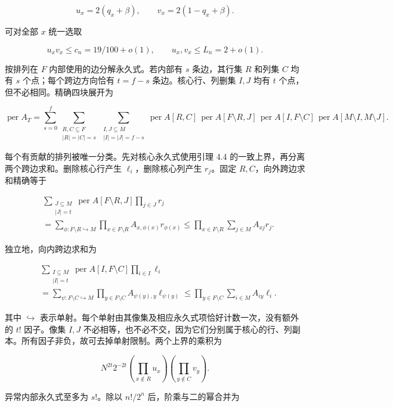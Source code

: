 \documentclass[11pt,a4paper]{article}
\begin{document}
\[u_x=2(q_x+\beta),\qquad v_x=2(1-q_x+\beta).\]

可对全部 \(x\) 统一选取

\[u_xv_x\le c_n=19/100+o(1),\qquad
u_x,v_x\le L_n=2+o(1).\]

按排列在 \(F\) 内部使用的边分解永久式。若内部有 \(s\) 条边，其行集 \(R\) 和列集 \(C\) 均有 \(s\) 个点；每个跨边方向恰有 \(t=f-s\) 条边。核心行、列删集 \(I,J\) 均有 \(t\) 个点，但不必相同。精确四块展开为

\[\operatorname{per}A_T
=\sum_{s=0}^{f}
\sum_{\substack{R,C\subseteq F\\|R|=|C|=s}}
\sum_{\substack{I,J\subseteq M\\|I|=|J|=f-s}}
\operatorname{per}A[R,C]\,
\operatorname{per}A[F\setminus R,J]\,
\operatorname{per}A[I,F\setminus C]\,
\operatorname{per}A[M\setminus I,M\setminus J].\]

每个有贡献的排列被唯一分类。先对核心永久式使用引理 4.4 的一致上界，再分离两个跨边求和。删除核心行产生 \(\ell_i\)，删除核心列产生 \(r_j\)。固定 \(R,C\)，向外跨边求和精确等于

\[\begin{aligned}
&\sum_{\substack{J\subseteq M\\|J|=t}}
\operatorname{per}A[F\setminus R,J]\prod_{j\in J}r_j\\
&=\sum_{\phi:F\setminus R\hookrightarrow M}
\prod_{x\in F\setminus R}A_{x,\phi(x)}r_{\phi(x)}
\le\prod_{x\in F\setminus R}\sum_{j\in M}A_{xj}r_j.
\end{aligned}\]

独立地，向内跨边求和为

\[\begin{aligned}
&\sum_{\substack{I\subseteq M\\|I|=t}}
\operatorname{per}A[I,F\setminus C]\prod_{i\in I}\ell_i\\
&=\sum_{\psi:F\setminus C\hookrightarrow M}
\prod_{y\in F\setminus C}A_{\psi(y),y}\ell_{\psi(y)}
\le\prod_{y\in F\setminus C}\sum_{i\in M}A_{iy}\ell_i.
\end{aligned}\]

其中 \(\hookrightarrow\) 表示单射。每个单射由其像集及相应永久式项恰好计数一次，没有额外的 \(t!\) 因子。像集 \(I,J\) 不必相等，也不必不交，因为它们分别属于核心的行、列副本。所有因子非负，故可去掉单射限制。两个上界的乘积为

\[N^{2t}2^{-2t}
\left(\prod_{x\notin R}u_x\right)
\left(\prod_{y\notin C}v_y\right).\]

异常内部永久式至多为 \(s!\)。除以 \(n!/2^n\) 后，阶乘与二的幂合并为
\end{document}
